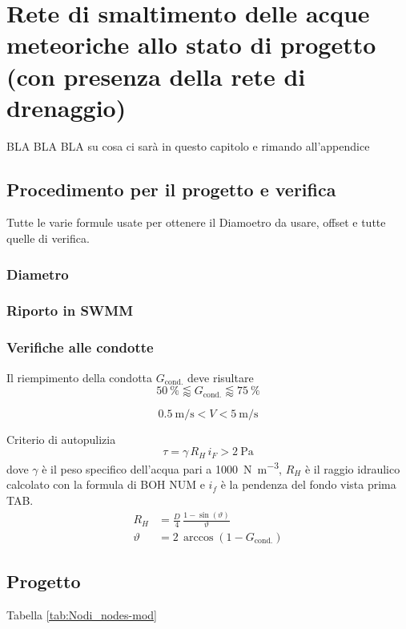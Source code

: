 \chapter{Rete di smaltimento delle acque meteoriche allo stato di progetto (con presenza
della rete di drenaggio)}
BLA BLA BLA su cosa ci sarà in questo capitolo e rimando all'appendice
\section{Procedimento per il progetto e verifica}
Tutte le varie formule usate per ottenere il Diamoetro da usare, offset e tutte quelle di verifica.
\subsection{Diametro}
\subsection{Riporto in SWMM}
\subsection{Verifiche alle condotte}
Il riempimento della condotta $G_\text{cond.}$ deve risultare 
\begin{equation}
    \SI{50}{\percent} \lessapprox G_\text{cond.} \lessapprox\SI{75}{\percent}
\end{equation}


\begin{equation}
    \SI{0.5}{\metre\per\second} < V <  \SI{5}{\metre\per\second}
\end{equation}

Criterio di autopulizia
\begin{equation}
    \tau = \gamma \, R_H \, i_F > \SI{2}{\pascal}
\end{equation}
dove $\gamma$ è il peso specifico dell'acqua pari a \SI{1000}{\newton\per\metre\cubed}, $R_H$ è il raggio idraulico calcolato con la formula di BOH NUM e $i_f$ è la pendenza del fondo vista prima TAB.  
\begin{align}
    R_H &= \frac{D}{4} \, \frac{1 - \sin(\vartheta)}{\vartheta} \\
    \vartheta &= 2 \, \arccos(1 - G_\text{cond.})
\end{align}






\section{Progetto}
Tabella \ref{tab:Nodi_nodes-mod} 

